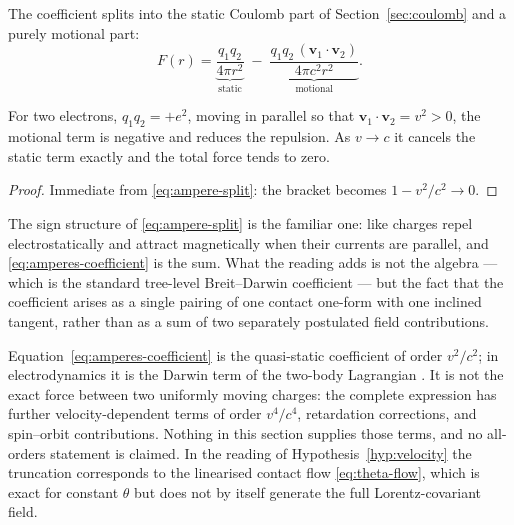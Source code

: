 The coefficient splits into the static Coulomb part of
Section~\ref{sec:coulomb} and a purely motional part:
\begin{equation}\label{eq:ampere-split}
  F(r)=\underbrace{\frac{q_1q_2}{4\pi r^{2}}}_{\text{static}}
       \;-\;\underbrace{\frac{q_1q_2\,(\mathbf v_1\!\cdot\!\mathbf v_2)}{4\pi c^{2}r^{2}}}_{\text{motional}} .
\end{equation}

\begin{corollary}
\label{cor:parallel-currents}
For two electrons, $q_1q_2=+e^{2}$, moving in parallel so that
$\mathbf v_1\!\cdot\!\mathbf v_2=v^{2}>0$, the motional term is negative and
reduces the repulsion.  As $v\to c$ it cancels the static term exactly and the
total force tends to zero.
\end{corollary}

\begin{proof}
Immediate from \eqref{eq:ampere-split}: the bracket becomes
$1-v^{2}/c^{2}\to0$.
\end{proof}

The sign structure of \eqref{eq:ampere-split} is the familiar one: like charges
repel electrostatically and attract magnetically when their currents are
parallel, and \eqref{eq:amperes-coefficient} is the sum.  What the \AEG{} reading
adds is not the algebra --- which is the standard tree-level Breit--Darwin
coefficient --- but the fact that the coefficient arises as a single pairing of
one contact one-form with one inclined tangent, rather than as a sum of two
separately postulated field contributions.

\begin{warning}
\label{warn:darwin}
Equation~\eqref{eq:amperes-coefficient} is the quasi-static coefficient of order
$v^{2}/c^{2}$; in electrodynamics it is the Darwin term of the two-body
Lagrangian \cite{Darwin1920,Jackson1999}.  It is not the exact force between two
uniformly moving charges: the complete expression has further velocity-dependent
terms of order $v^{4}/c^{4}$, retardation corrections, and spin--orbit
contributions.  Nothing in this section supplies those terms, and no
all-orders statement is claimed.  In the reading of
Hypothesis~\ref{hyp:velocity} the truncation corresponds to the linearised
contact flow \eqref{eq:theta-flow}, which is exact for constant $\theta$ but
does not by itself generate the full Lorentz-covariant field.
\end{warning}

